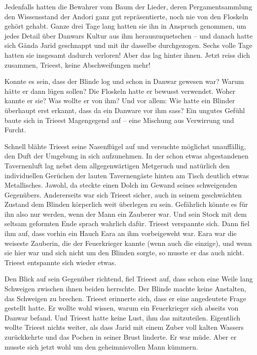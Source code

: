 Jedenfalls hatten die Bewahrer vom Baum der Lieder, deren Pergamentsammlung den Wissensstand der Andori ganz gut repräsentierte, noch nie von den Floskeln gehört gehabt. Ganze drei Tage lang hatten sie ihn in Anspruch genommen, um jedes Detail über Danwars Kultur aus ihm herauszuquetschen – und danach hatte sich Gända Jarid geschnappt und mit ihr dasselbe durchgezogen. Sechs volle Tage hatten sie insgesamt dadurch verloren! Aber das lag hinter ihnen. Jetzt reiss dich zusammen, Trieest, keine Abschweifungen mehr!

Konnte es sein, dass der Blinde log und schon in Danwar gewesen war? Warum hätte er dann lügen sollen? Die Floskeln hatte er bewusst verwendet. Woher kannte er sie? Was wollte er von ihm? Und vor allem: Wie hatte ein Blinder überhaupt erst erkannt, dass da ein Danware vor ihm sass? Ein ungutes Gefühl baute sich in Trieest Magengegend auf – eine Mischung aus Verwirrung und Furcht.

Schnell blähte Trieest seine Nasenflügel auf und versuchte möglichst unauffällig, den Duft der Umgebung in sich aufzunehmen. In der schon etwas abgestandenen Tavernenluft lag nebst dem allgegenwärtigen Metgeruch und natürlich den individuellen Gerüchen der lauten Tavernengäste hinten am Tisch deutlich etwas Metallisches. Jawohl, da steckte einen Dolch im Gewand seines schweigenden Gegenübers. Andererseits war sich Trieest sicher, auch in seinem geschwächten Zustand dem Blinden körperlich weit überlegen zu sein. Gefährlich könnte es für ihn also nur werden, wenn der Mann ein Zauberer war. Und sein Stock mit dem seltsam geformten Ende sprach wahrlich dafür. Trieest verspannte sich. Dann fiel ihm auf, dass vorhin ein Hauch Eara an ihm vorbeigeweht war. Eara war die weiseste Zauberin, die der Feuerkrieger kannte (wenn auch die einzige), und wenn sie hier war und sich nicht um den Blinden sorgte, so musste er das auch nicht. Trieest entspannte sich wieder etwas.

Den Blick auf sein Gegenüber richtend, fiel Trieest auf, dass schon eine Weile lang Schweigen zwischen ihnen beiden herrschte. Der Blinde machte keine Anstalten, das Schweigen zu brechen. Trieest erinnerte sich, dass er eine angedeutete Frage gestellt hatte. Er wollte wohl wissen, warum ein Feuerkrieger sich abseits von Danwar befand. Und Trieest hatte keine Lust, ihm das mitzuteilen. Eigentlich wollte Trieest nichts weiter, als dass Jarid mit einem Zuber voll kalten Wassers zurückkehrte und das Pochen in seiner Brust linderte. Er war müde. Aber er musste sich jetzt wohl um den geheimnisvollen Mann kümmern.

